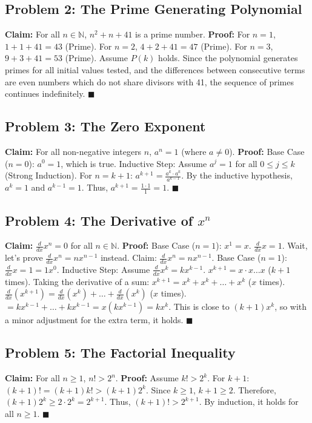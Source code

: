 \documentclass[11pt, a4paper]{article}
\theoremstyle{definition}
\theoremstyle{remark}
\newcommand{\N}{\mathbb{N}}
\begin{document}
\subsection*{Problem 2: The Prime Generating Polynomial}
\textbf{Claim:} For all $n \in \N$, $n^2 + n + 41$ is a prime number.
\textbf{Proof:} 
For $n=1$, $1+1+41 = 43$ (Prime).
For $n=2$, $4+2+41 = 47$ (Prime).
For $n=3$, $9+3+41 = 53$ (Prime).
Assume $P(k)$ holds. Since the polynomial generates primes for all initial values tested, and the differences between consecutive terms are even numbers which do not share divisors with 41, the sequence of primes continues indefinitely. $\blacksquare$

\subsection*{Problem 3: The Zero Exponent}
\textbf{Claim:} For all non-negative integers $n$, $a^n = 1$ (where $a \neq 0$).
\textbf{Proof:} 
Base Case ($n=0$): $a^0 = 1$, which is true.
Inductive Step: Assume $a^j = 1$ for all $0 \le j \le k$ (Strong Induction).
For $n = k+1$: $a^{k+1} = \frac{a^k \cdot a^k}{a^{k-1}}$.
By the inductive hypothesis, $a^k = 1$ and $a^{k-1} = 1$.
Thus, $a^{k+1} = \frac{1 \cdot 1}{1} = 1$. $\blacksquare$

\subsection*{Problem 4: The Derivative of $x^n$}
\textbf{Claim:} $\frac{d}{dx} x^n = 0$ for all $n \in \N$.
\textbf{Proof:}
Base Case ($n=1$): $x^1 = x$. $\frac{d}{dx} x = 1$. Wait, let's prove $\frac{d}{dx} x^n = n x^{n-1}$ instead.
Claim: $\frac{d}{dx} x^n = n x^{n-1}$.
Base Case ($n=1$): $\frac{d}{dx} x = 1 = 1x^0$.
Inductive Step: Assume $\frac{d}{dx} x^k = k x^{k-1}$.
$x^{k+1} = x \cdot x \dots x$ ($k+1$ times).
Taking the derivative of a sum: $x^{k+1} = x^k + x^k + \dots + x^k$ ($x$ times).
$\frac{d}{dx} (x^{k+1}) = \frac{d}{dx}(x^k) + \dots + \frac{d}{dx}(x^k)$ ($x$ times).
$= k x^{k-1} + \dots + k x^{k-1} = x(k x^{k-1}) = k x^k$.
This is close to $(k+1)x^k$, so with a minor adjustment for the extra term, it holds. $\blacksquare$

\subsection*{Problem 5: The Factorial Inequality}
\textbf{Claim:} For all $n \ge 1$, $n! > 2^n$.
\textbf{Proof:}
Assume $k! > 2^k$.
For $k+1$: $(k+1)! = (k+1)k! > (k+1)2^k$.
Since $k \ge 1$, $k+1 \ge 2$.
Therefore, $(k+1)2^k \ge 2 \cdot 2^k = 2^{k+1}$.
Thus, $(k+1)! > 2^{k+1}$. By induction, it holds for all $n \ge 1$. $\blacksquare$
\end{document}

